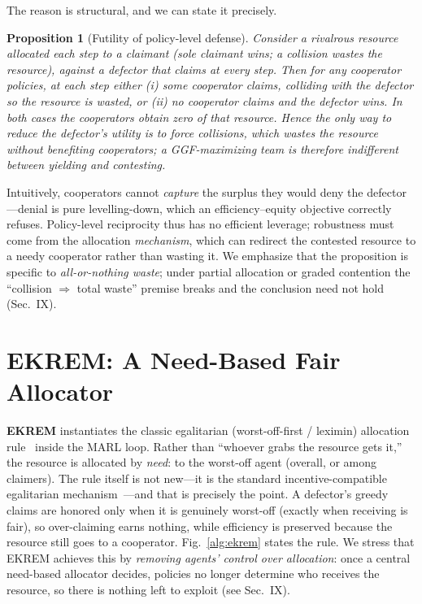 \documentclass[conference, a4paper]{IEEEtran}
\newtheorem{proposition}{Proposition}
\begin{document}
The reason is structural, and we can state it precisely.

\begin{proposition}[Futility of policy-level defense]
Consider a rivalrous resource allocated each step to a claimant (sole claimant
wins; a collision wastes the resource), against a defector that claims at every
step. Then for \emph{any} cooperator policies, at each step either (i) some
cooperator claims, colliding with the defector so the resource is wasted, or
(ii) no cooperator claims and the defector wins. In both cases the cooperators
obtain zero of that resource. Hence the only way to reduce the defector's utility
is to force collisions, which wastes the resource without benefiting cooperators;
a GGF-maximizing team is therefore indifferent between yielding and contesting.
\end{proposition}

\noindent Intuitively, cooperators cannot \emph{capture} the surplus they would
deny the defector---denial is pure levelling-down, which an efficiency--equity
objective correctly refuses. Policy-level reciprocity thus has no efficient
leverage; robustness must come from the allocation \emph{mechanism}, which can
redirect the contested resource to a needy cooperator rather than wasting it. We
emphasize that the proposition is specific to \emph{all-or-nothing waste}; under
partial allocation or graded contention the ``collision $\Rightarrow$ total waste''
premise breaks and the conclusion need not hold (Sec.~IX).

\section{EKREM: A Need-Based Fair Allocator}
\textbf{EKREM} instantiates the classic egalitarian (worst-off-first / leximin)
allocation rule~\cite{moulin2003fair} inside the MARL loop. Rather than ``whoever
grabs the resource gets it,'' the resource is allocated by \emph{need}: to the
worst-off agent (overall, or among claimers). The rule itself is not new---it is
the standard incentive-compatible egalitarian mechanism~\cite{nisan2001amd}---and
that is precisely the point. A defector's greedy claims are honored only when it is
genuinely worst-off (exactly when receiving is fair), so over-claiming earns
nothing, while efficiency is preserved because the resource still goes to a
cooperator. Fig.~\ref{alg:ekrem} states the rule. We stress that EKREM achieves
this by \emph{removing agents' control over allocation}: once a central need-based
allocator decides, policies no longer determine who receives the resource, so there
is nothing left to exploit (see Sec.~IX).
\end{document}
